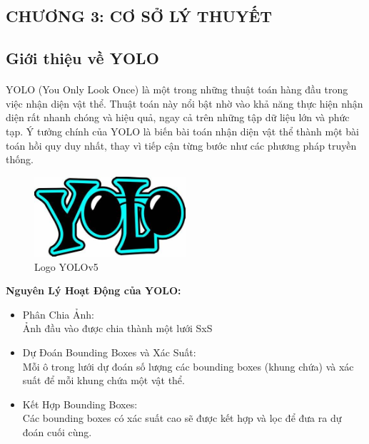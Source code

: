 \begin{flushleft}
    \fontsize{16}{20}\selectfont
    \section*{CHƯƠNG 3: CƠ SỞ LÝ THUYẾT}
    \fontsize{13}{20}\selectfont
    \setcounter{section}{3}
    \setcounter{subsection}{0}
    \subsection{Giới thiệu về YOLO}
    \fontsize{13}{20}\selectfont\paragraph{}
    YOLO (You Only Look Once) là một trong những thuật toán hàng đầu trong việc nhận diện vật thể. Thuật toán này nổi bật nhờ vào khả năng thực hiện nhận diện rất nhanh chóng và hiệu quả, ngay cả trên những tập dữ liệu lớn và phức tạp. Ý tưởng chính của YOLO là biến bài toán nhận diện vật thể thành một bài toán hồi quy duy nhất, thay vì tiếp cận từng bước như các phương pháp truyền thống.\\
    \begin{figure}[h]
        \centering
        \includegraphics[width=0.5\textwidth]{images/YOLO.jpg}
        \caption{Logo YOLOv5}\label{fig:logo_YOLO}
    \end{figure}
    \textbf{Nguyên Lý Hoạt Động của YOLO:}\\
    \begin{itemize}
            \item Phân Chia Ảnh: \\Ảnh đầu vào được chia thành một lưới SxS
            \item Dự Đoán Bounding Boxes và Xác Suất:\\Mỗi ô trong lưới dự đoán số lượng các bounding boxes (khung chứa) và xác suất để mỗi khung chứa một vật thể.
            \item Kết Hợp Bounding Boxes: \\Các bounding boxes có xác suất cao sẽ được kết hợp và lọc để đưa ra dự đoán cuối cùng.

\end{itemize}
\end{flushleft}
